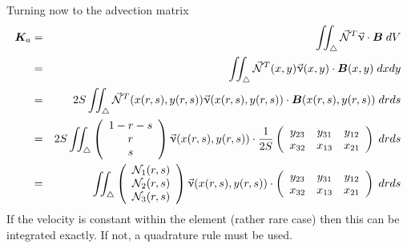 Turning now to the advection matrix
\begin{eqnarray}
{\bm K}_a 
&=& \iint_\triangle \vec{{\mathcal{N}}}^T \vec{\upnu}\cdot {\bm B} \; dV \nonumber\\
&=& \iint_\triangle \vec{{\mathcal{N}}}^T(x,y) \vec{\upnu}(x,y)\cdot {\bm B}(x,y) \; dx dy \nonumber\\
&=& 2S \iint_\triangle \vec{{\mathcal{N}}}^T(x(r,s),y(r,s)) \vec{\upnu}(x(r,s),y(r,s))\cdot {\bm B}(x(r,s),y(r,s)) \; dr ds \nonumber\\
&=& 2S \iint_\triangle 
\left(
\begin{array}{c} 
1-r-s \\ r \\ s 
\end{array}
\right)
\vec{\upnu}(x(r,s),y(r,s))\cdot 
\frac{1}{2S}
\left(
\begin{array}{ccc}
y_{23} & y_{31} & y_{12} \\
x_{32} & x_{13} & x_{21}
\end{array}
\right)
\; dr ds \nonumber\\
&=&  \iint_\triangle 
\left(
\begin{array}{c} 
{\mathcal{N}}_1(r,s) \\ {\mathcal{N}}_2(r,s) \\ {\mathcal{N}}_3(r,s)
\end{array}
\right)
\vec{\upnu}(x(r,s),y(r,s))\cdot 
\left(
\begin{array}{ccc}
y_{23} & y_{31} & y_{12} \\
x_{32} & x_{13} & x_{21}
\end{array}
\right)
\; dr ds \nonumber
\end{eqnarray}
If the velocity is constant within the element (rather rare case) then this can be integrated exactly.
If not, a quadrature rule must be used. 

